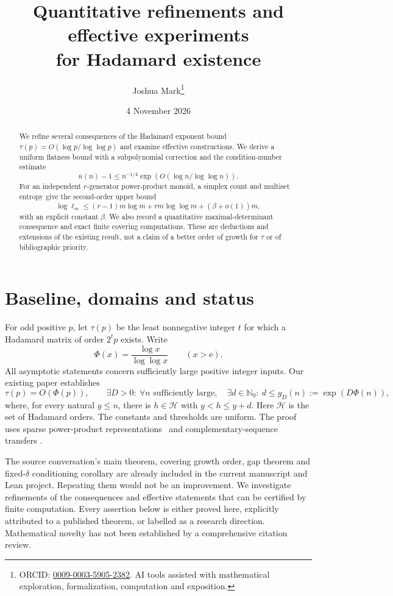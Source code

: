 \documentclass[11pt]{article}
\title{Quantitative refinements and effective experiments\\for Hadamard existence}
\author{Joshua Mark\thanks{ORCID: \href{https://orcid.org/0009-0003-5905-2382}{0009-0003-5905-2382}. AI tools assisted with mathematical exploration, formalization, computation and exposition.}}
\date{4 November 2026}
\newcommand{\NN}{\mathbb N_0}
\newcommand{\HH}{\mathcal H}
\newcommand{\ph}{\Phi}
\newcommand{\ee}{\mathrm e}
\begin{document}
\maketitle
\begin{abstract}
We refine several consequences of the Hadamard exponent bound
$\tau(p)=O(\log p/\log\log p)$ and examine effective constructions. We derive a uniform flatness
bound with a subpolynomial correction and the condition-number estimate
\[\kappa(n)-1\le n^{-1/4}\exp(O(\log n/\log\log n)).\]
For an independent $r$-generator power-product monoid, a simplex count and
multiset entropy give the second-order upper bound
\[\log\ell_m\le(r-1)m\log m+rm\log\log m+(\beta+o(1))m,\]
with an explicit
constant $\beta$. We also record a quantitative maximal-determinant
consequence and exact finite covering computations. These are deductions
and extensions of the existing result, not a claim of a better order of
growth for $\tau$ or of bibliographic priority.
\end{abstract}

\section{Baseline, domains and status}
For odd positive $p$, let $\tau(p)$ be the least nonnegative integer $t$
for which a Hadamard matrix of order $2^tp$ exists. Write
\[
\ph(x)=\frac{\log x}{\log\log x}\qquad(x>\ee).
\]
All asymptotic statements concern sufficiently large positive integer
inputs. Our existing paper establishes
\begin{equation}\label{eq:baseline}
\tau(p)=O(\ph(p)),\qquad
\exists D>0:\ \forall n\text{ sufficiently large},\quad
\exists d\in\NN:\ d\le g_D(n):=\exp(D\ph(n)),
\end{equation}
where, for every natural $y\le n$, there is $h\in\HH$ with
$y<h\le y+d$. Here $\HH$ is the set of Hadamard orders. The constants
and thresholds are uniform. The proof uses sparse power-product
representations~\cite{KSW} and complementary-sequence transfers
\cite{Craigen,Livinskyi}.

The source conversation's main theorem, covering growth order, gap
theorem and fixed-$\delta$ conditioning corollary are already included
in the current manuscript and Lean project. Repeating them would not be
an improvement. We investigate refinements of the consequences and
effective statements that can be certified by finite computation.
Every assertion below is either proved here, explicitly attributed to a
published theorem, or labelled as a research direction. Mathematical
novelty has not been established by a comprehensive citation review.
\end{document}
